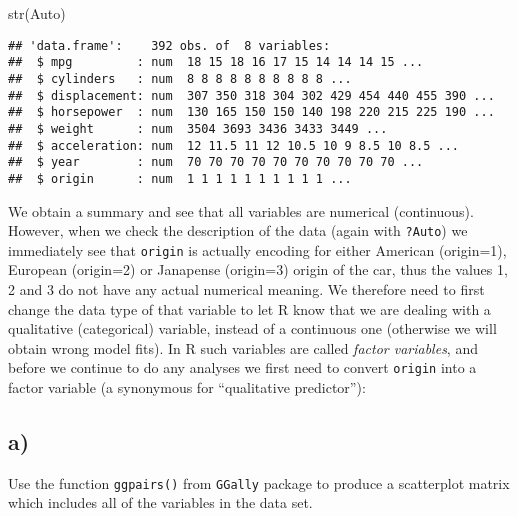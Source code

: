 \documentclass[
]{article}
\newenvironment{Shaded}{\begin{snugshade}}{\end{snugshade}}
\newcommand{\FunctionTok}[1]{\textcolor[rgb]{0.00,0.00,0.00}{#1}}
\newcommand{\NormalTok}[1]{#1}
\newcommand{\OtherTok}[1]{\textcolor[rgb]{0.56,0.35,0.01}{#1}}
\newcommand{\SpecialCharTok}[1]{\textcolor[rgb]{0.00,0.00,0.00}{#1}}
\begin{document}
\begin{Shaded}
\begin{Highlighting}[]
\FunctionTok{str}\NormalTok{(Auto)}
\end{Highlighting}
\end{Shaded}

\begin{verbatim}
## 'data.frame':    392 obs. of  8 variables:
##  $ mpg         : num  18 15 18 16 17 15 14 14 14 15 ...
##  $ cylinders   : num  8 8 8 8 8 8 8 8 8 8 ...
##  $ displacement: num  307 350 318 304 302 429 454 440 455 390 ...
##  $ horsepower  : num  130 165 150 150 140 198 220 215 225 190 ...
##  $ weight      : num  3504 3693 3436 3433 3449 ...
##  $ acceleration: num  12 11.5 11 12 10.5 10 9 8.5 10 8.5 ...
##  $ year        : num  70 70 70 70 70 70 70 70 70 70 ...
##  $ origin      : num  1 1 1 1 1 1 1 1 1 1 ...
\end{verbatim}

We obtain a summary and see that all variables are numerical
(continuous). However, when we check the description of the data (again
with \texttt{?Auto}) we immediately see that \texttt{origin} is actually
encoding for either American (origin=1), European (origin=2) or
Janapense (origin=3) origin of the car, thus the values 1, 2 and 3 do
not have any actual numerical meaning. We therefore need to first change
the data type of that variable to let R know that we are dealing with a
qualitative (categorical) variable, instead of a continuous one
(otherwise we will obtain wrong model fits). In R such variables are
called \emph{factor variables}, and before we continue to do any
analyses we first need to convert \texttt{origin} into a factor variable
(a synonymous for ``qualitative predictor''):

\begin{Shaded}
\end{Shaded}

\hypertarget{a}{%
\subsection{a)}\label{a}}

Use the function \texttt{ggpairs()} from \texttt{GGally} package to
produce a scatterplot matrix which includes all of the variables in the
data set.
\end{document}
